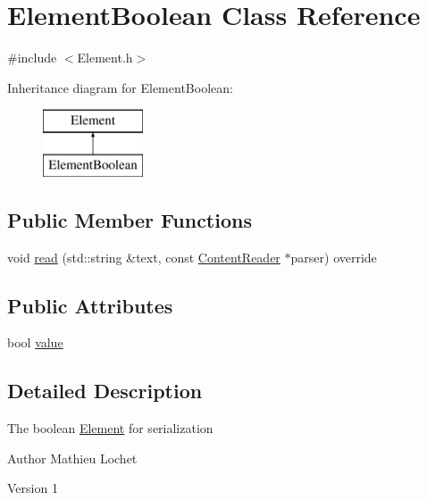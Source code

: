 \hypertarget{classElementBoolean}{}\section{Element\+Boolean Class Reference}
\label{classElementBoolean}


{\ttfamily \#include $<$Element.\+h$>$}

Inheritance diagram for Element\+Boolean\+:\begin{figure}[H]
\begin{center}
\leavevmode
\includegraphics[height=2.000000cm]{classElementBoolean}
\end{center}
\end{figure}
\subsection*{Public Member Functions}
\begin{DoxyCompactItemize}
\item 
void \mbox{\hyperlink{classElementBoolean_afca7544719a8e13fb38f62d57df343b7}{read}} (std\+::string \&text, const \mbox{\hyperlink{classContentReader}{Content\+Reader}} $\ast$parser) override
\end{DoxyCompactItemize}
\subsection*{Public Attributes}
\begin{DoxyCompactItemize}
\item 
bool \mbox{\hyperlink{classElementBoolean_a470b48a447bd7704bbf57fc42d78a4e2}{value}}
\end{DoxyCompactItemize}


\subsection{Detailed Description}
The boolean \mbox{\hyperlink{classElement}{Element}} for serialization

\begin{DoxyAuthor}{Author}
Mathieu Lochet 
\end{DoxyAuthor}
\begin{DoxyVersion}{Version}
1 
\end{DoxyVersion}


